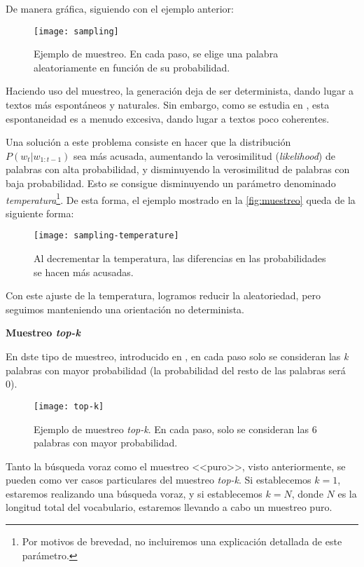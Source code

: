 De manera gráfica, siguiendo con el ejemplo anterior:

\begin{figure}[!h]
	\centering
	\texttt{[image: sampling]}
	\caption[Ejemplo de muestreo.]{Ejemplo de muestreo. En cada paso, se elige una palabra aleatoriamente en función de su probabilidad.}
	\label{fig:muestreo}
\end{figure}

Haciendo uso del muestreo, la generación deja de ser determinista, dando lugar a textos más espontáneos y naturales. Sin embargo, como se estudia en \cite{holtzman20}, esta espontaneidad es a menudo excesiva, dando lugar a textos poco coherentes.

Una solución a este problema consiste en hacer que la distribución $P(w_t|w_{1:t-1})$ sea más acusada, aumentando la verosimilitud (\emph{likelihood}) de palabras con alta probabilidad, y disminuyendo la verosimilitud de palabras con baja probabilidad. Esto se consigue disminuyendo un parámetro denominado \emph{temperatura}\footnote{\hspace{0.06cm}Por motivos de brevedad, no incluiremos una explicación detallada de este parámetro.}. De esta forma, el ejemplo mostrado en la \autoref{fig:muestreo} queda de la siguiente forma:

\begin{figure}[!h]
	\centering
	\texttt{[image: sampling-temperature]}
	\caption[Ejemplo de muestreo con temperatura.]{Al decrementar la temperatura, las diferencias en las  probabilidades se hacen más acusadas.}
\end{figure}

Con este ajuste de la temperatura, logramos reducir la aleatoriedad, pero seguimos manteniendo una orientación no determinista.

\bigskip
\noindent
\textbf{Muestreo \emph{top-k}}

En dste tipo de muestreo, introducido en \cite{fan18}, en cada paso solo se consideran las \emph{k} palabras con mayor probabilidad (la probabilidad del resto de las palabras será 0).

\begin{figure}[!h]
	\centering
	\texttt{[image: top-k]}
	\caption[Ejemplo de muestreo \emph{top-k}.]{Ejemplo de muestreo \emph{top-k}. En cada paso, solo se consideran las 6 palabras con mayor probabilidad.}
	\label{fig:top-k}
\end{figure}

Tanto la búsqueda voraz como el muestreo <<puro>>, visto anteriormente, se pueden como ver casos particulares del muestreo \emph{top-k}. Si establecemos $k = 1$, estaremos realizando una búsqueda voraz, y si establecemos $k = N$, donde $N$ es la longitud total del vocabulario, estaremos llevando a cabo un muestreo puro.

